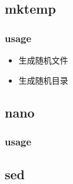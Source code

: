 \documentclass[a4paper,10pt,english]{sphinxmanual}
\begin{document}
\subsection{mktemp}
\label{\detokenize{linux/shell:mktemp}}

\subsubsection{usage}
\label{\detokenize{linux/shell:id6}}\begin{itemize}
\item {} 
生成随机文件

\begin{sphinxVerbatim}[commandchars=\\\{\}]
 
\end{sphinxVerbatim}

\item {} 
生成随机目录

\begin{sphinxVerbatim}[commandchars=\\\{\}]
  
\end{sphinxVerbatim}

\end{itemize}


\subsection{nano}
\label{\detokenize{linux/shell:nano}}

\subsubsection{usage}
\label{\detokenize{linux/shell:id7}}

\subsection{sed}
\label{\detokenize{linux/shell:sed}}
\end{document}
